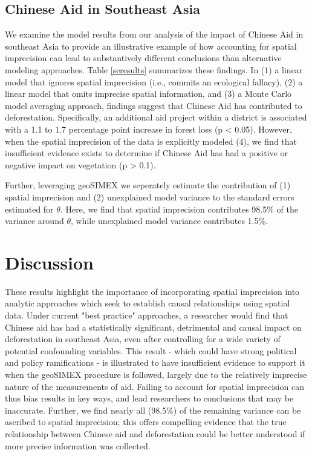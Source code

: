\subsection{Chinese Aid in Southeast Asia}
We examine the model results from our analysis of the impact of Chinese Aid in southeast Asia to provide an illustrative example of how accounting for spatial imprecision can lead to substantively different conclusions than alternative modeling approaches.
Table \ref{seresults} summarizes these findings.
In (1) a linear model that ignores spatial imprecision (i.e., commits an ecological fallacy), (2) a linear model that omits imprecise spatial information, and (3) a Monte Carlo model averaging approach, findings suggest that Chinese Aid has contributed to deforestation. Specifically, an additional aid project within a district is associated with a 1.1 to 1.7 percentage point increase in forest loss (p < 0.05).
However, when the spatial imprecision of the data is explicitly modeled (4), we find that insufficient evidence exists to determine if Chinese Aid has had a positive or negative impact on vegetation (p > 0.1).
\par
Further, leveraging geoSIMEX we seperately estimate the contribution of (1) spatial imprecision and (2) unexplained model variance to the standard errors estimated for $\theta$.
Here, we find that spatial imprecision contributes 98.5\% of the variance around $\theta$, while unexplained model variance contributes 1.5\%.

\newpage

\section{Discussion}
These results highlight the importance of incorporating spatial imprecision into analytic approaches which seek to establish causal relationships using spatial data.
Under current "best practice" approaches, a researcher would find that Chinese aid has had a statistically significant, detrimental and causal impact on deforestation in southeast Asia, even after controlling for a wide variety of potential confounding variables.
This result - which could have strong political and policy ramifications - is illustrated to have insufficient evidence to support it when the geoSIMEX procedure is followed, largely due to the relatively imprecise nature of the measurements of aid.
Failing to account for spatial imprecision can thus bias results in key ways, and lead researchers to conclusions that may be inaccurate.
Further, we find nearly all (98.5\%) of the remaining variance can be ascribed to spatial imprecision; this offers compelling evidence that the true relationship between Chinese aid and deforestation could be better understood if more precise information was collected.
